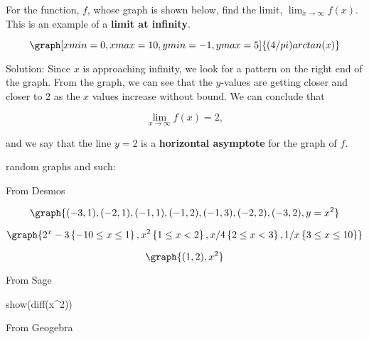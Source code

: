 \documentclass{ximera}
\begin{document}
\begin{example} %
For the function, $f$, whose graph is shown below, find the limit,
$\lim_{x \to \infty}f(x)$. This is an example of a {\bf limit at infinity}.

\[
\graph[xmin=0, xmax=10, ymin=-1, ymax=5]{(4/pi) arctan(x)}
\]



Solution:  Since $x$ is approaching infinity, we look for a pattern on the right end of the graph.  
From the graph, we can see that the $y$-values are getting closer and closer to $2$ as the $x$ values 
increase without bound. We can conclude that 

\[
\lim_{x \to \infty}f(x) = 2,
\]

and we say that the line $y = 2$ is a {\bf horizontal asymptote} for the graph of $f$.


\end{example}

random graphs and such:

From Desmos

\[
\graph{(-3,1), (-2, 1), (-1, 1), (-1, 2),  (-1, 3), (-2, 2), (-3, 2),y=x^2}
\]

\[
\graph{2^x -3 \left\{ -10 \leq x \leq 1 \right\}, x^2 \left\{1 \leq x < 2 \right\}, x/4 \left\{ 2 \leq x < 3\right\}, 1/x \left\{3 \leq x \leq 10 \right\}}
\]

\[
\graph{(1,2), x^2}
\]



From Sage
\begin{sageOutput}
    show(diff(x^2))
\end{sageOutput}

From Geogebra
\end{document}
